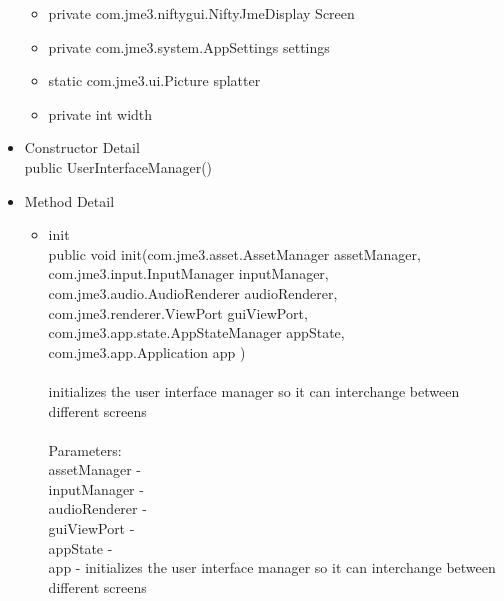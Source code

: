 \documentclass[letterpaper]{article}
\begin{document}
\begin{itemize}
\begin{itemize}
		\item private com.jme3.niftygui.NiftyJmeDisplay 	Screen 
		 
		\item private com.jme3.system.AppSettings 	settings 
		 
		\item static com.jme3.ui.Picture 	splatter 
		 
		\item private int 	width 										\end{itemize}
										\item	Constructor Detail \\
												public UserInterfaceManager()
										\item	Method Detail
												\begin{itemize}
													\item	init \\
															public void init(com.jme3.asset.AssetManager assetManager, \\
						        com.jme3.input.InputManager inputManager, \\
						        com.jme3.audio.AudioRenderer audioRenderer, \\
						        com.jme3.renderer.ViewPort guiViewPort, \\
						        com.jme3.app.state.AppStateManager appState, \\
						        com.jme3.app.Application app ) \\ \\
						        initializes the user interface manager so it can interchange between different screens \\ \\
															Parameters: \\
															assetManager - \\
															inputManager - \\
															audioRenderer - \\
															guiViewPort - \\
															appState - \\
															app - initializes the user interface manager so it can interchange between different screens \\
		

\end{itemize}
\end{itemize}
\end{document}
